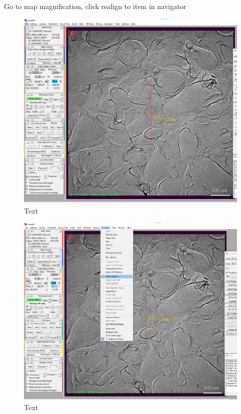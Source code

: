 \documentclass[12pt, a4paper]{scrartcl}
\begin{document}
Go to map magnification, click realign to item in navigator

\begin{figure}[H]
\includegraphics[width=\linewidth]{screenshots/RealignedToItem.png}
\caption{Text}
\end{figure}

\begin{figure}[H]
\includegraphics[width=\linewidth]{screenshots/ShiftToMarkerMap.png}
\caption{Text}
\end{figure}
\end{document}
